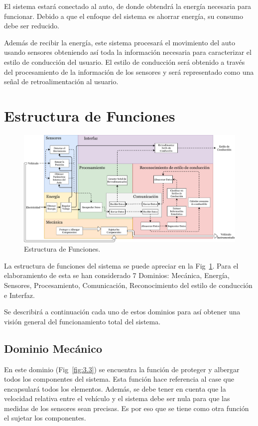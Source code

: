 El sistema estará conectado al auto, de donde obtendrá la energía necesaria para funcionar. Debido a que el enfoque del sistema es ahorrar energía, su consumo debe ser reducido.

Además de recibir la energía, este sistema procesará el movimiento del auto usando sensores obteniendo así toda la información necesaria para caracterizar el estilo de conducción del usuario. El estilo de conducción será obtenido a través del procesamiento de la información de los sensores y será representado como una señal de retroalimentación al usuario.

\section{Estructura de Funciones}

\begin{figure}
\centering
\includegraphics[width=\textwidth]{Tab3.pdf}
\caption{Estructura de Funciones.}
\label{fig:3.2}
\end{figure}

La estructura de funciones del sistema se puede apreciar en la Fig~\ref{fig:3.2}. Para el elaboramiento de esta se han considerado 7 Dominios: Mecánica, Energía, Sensores, Procesamiento, Comunicación, Reconocimiento del estilo de conducción e Interfaz.

Se describirá a continuación cada uno de estos dominios para así obtener una visión general del funcionamiento total del sistema.

\subsection{Dominio Mecánico}
En este dominio (Fig~\ref{fig:3.3}) se encuentra la  función de proteger y albergar todos los componentes del sistema. Esta función hace referencia al case que encapsulará todos los elementos. Además, se debe tener en cuenta que la velocidad relativa entre el vehículo y el sistema debe ser nula para que las medidas de los sensores sean precisas. Es por eso que se tiene como otra función el sujetar los componentes.


